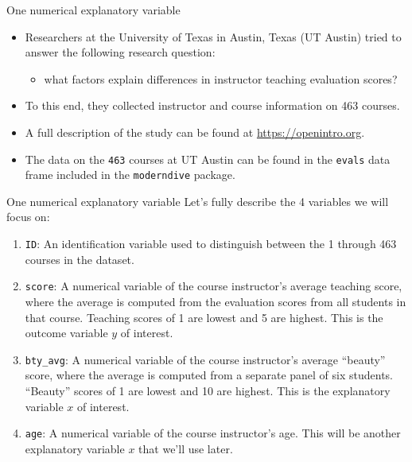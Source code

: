 \documentclass[
  ignorenonframetext,
]{beamer}
\providecommand{\tightlist}{%
  \setlength{\itemsep}{0pt}\setlength{\parskip}{0pt}}
\begin{document}
\begin{frame}[fragile]{One numerical explanatory variable}
\protect\hypertarget{one-numerical-explanatory-variable}{}
\begin{itemize}
\item
  Researchers at the University of Texas in Austin, Texas (UT Austin)
  tried to answer the following research question:

  \begin{itemize}
  \tightlist
  \item
    what factors explain differences in instructor teaching evaluation
    scores?
  \end{itemize}
\item
  To this end, they collected instructor and course information on 463
  courses.
\item
  A full description of the study can be found at
  \url{https://openintro.org}.
\item
  The data on the \texttt{463} courses at UT Austin can be found in the
  \texttt{evals} data frame included in the \texttt{moderndive} package.
\end{itemize}
\end{frame}

\begin{frame}[fragile]{One numerical explanatory variable}
\protect\hypertarget{one-numerical-explanatory-variable-1}{}
Let's fully describe the 4 variables we will focus on:

\begin{enumerate}
\item
  \texttt{ID}: An identification variable used to distinguish between
  the 1 through 463 courses in the dataset.
\item
  \texttt{score}: A numerical variable of the course instructor's
  average teaching score, where the average is computed from the
  evaluation scores from all students in that course. Teaching scores of
  1 are lowest and 5 are highest. This is the outcome variable \(y\) of
  interest.
\item
  \texttt{bty\_avg}: A numerical variable of the course instructor's
  average ``beauty'' score, where the average is computed from a
  separate panel of six students. ``Beauty'' scores of 1 are lowest and
  10 are highest. This is the explanatory variable \(x\) of interest.
\item
  \texttt{age}: A numerical variable of the course instructor's age.
  This will be another explanatory variable \(x\) that we'll use later.
\end{enumerate}
\end{frame}
\end{document}
